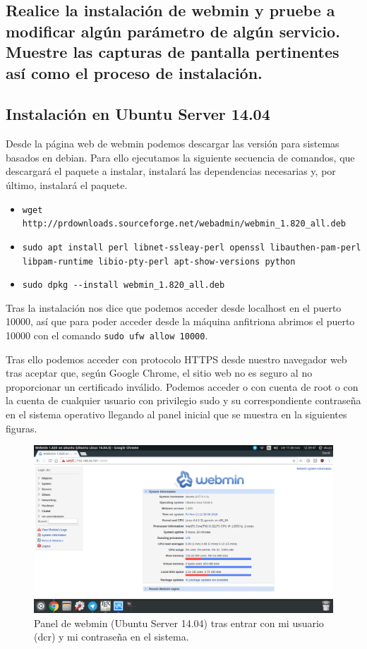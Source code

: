 \begin{flushleft}
\section{Realice la instalación de webmin y pruebe a modificar algún parámetro de algún servicio. Muestre las capturas de pantalla pertinentes así como el proceso de instalación.}
\subsection{Instalación en Ubuntu Server 14.04}
Desde la página web de webmin \cite{c12a} podemos descargar las versión para sistemas basados en debian. Para ello ejecutamos la siguiente secuencia de comandos, que descargará el paquete a instalar, instalará las dependencias necesarias y, por último, instalará el paquete.

\begin{itemize}
	\item \verb|wget http://prdownloads.sourceforge.net/webadmin/webmin_1.820_all.deb|
	\item \verb|sudo apt install perl libnet-ssleay-perl openssl libauthen-pam-perl| \linebreak 
	      \verb|libpam-runtime libio-pty-perl apt-show-versions python|
	\item \verb|sudo dpkg --install webmin_1.820_all.deb|
\end{itemize}

Tras la instalación nos dice que podemos acceder desde localhost en el puerto 10000, así que para poder acceder desde la máquina anfitriona abrimos el puerto 10000 con el comando \verb|sudo ufw allow 10000|. 

Tras ello podemos acceder con protocolo HTTPS desde nuestro navegador web tras aceptar que, según Google Chrome, el sitio web no es seguro al no proporcionar un certificado inválido. Podemos acceder o con cuenta de root o con la cuenta de cualquier usuario con privilegio sudo y su correspondiente contraseña en el sistema operativo llegando al panel inicial que se muestra en la siguientes figuras.

\begin{figure}[H]
	\centering
	\includegraphics[scale=0.3]{webmin1.png}
	\caption{Panel de webmin (Ubuntu Server 14.04) tras entrar con mi usuario (dcr) y mi contraseña en el sistema.}
\end{figure}


\end{flushleft}
